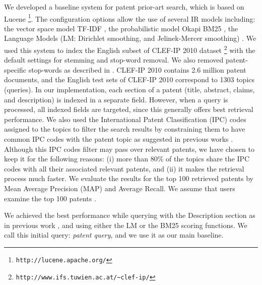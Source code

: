 We developed a baseline system for patent prior-art search, which
is based on Lucene%
\footnote{\texttt{http://lucene.apache.org/}%
}. The configuration options allow the use of several IR models including:
the vector space model TF-IDF \cite{Salton1975}, the probabilistic
model Okapi BM25 \cite{Robertson1993}, the Language Models (LM: Dirichlet
smoothing, and Jelinek-Mercer smoothing) \cite{Zhai2001}. We used
this system to index the English subset of CLEF-IP 2010 dataset%
\footnote{\texttt{http://www.ifs.tuwien.ac.at/\textasciitilde{}clef-ip/}%
} with the default settings for stemming and stop-word removal. We
also removed patent-specific stop-words as described in \cite{magdy2012toward}.
CLEF-IP 2010 contains 2.6 million patent documents, and the English
test sets of CLEF-IP 2010 correspond to 1303 topics (queries). In
our implementation, each section of a patent (title, abstract, claims,
and description) is indexed in a separate field. However, when a query
is processed, all indexed fields are targeted, since this generally
offers best retrieval performance. We also used the International
Patent Classification (IPC) codes assigned to the topics to filter
the search results by constraining them to have common IPC codes with
the patent topic as suggested in previous works \cite{lopez2010patatras}.
Although this IPC codes filter may pass over  relevant patents, we
have chosen to keep it for the following reasons: (i) more than 80\%
of the topics share the IPC codes with all their associated relevant
patents, and (ii) it makes the retrieval process much faster. We evaluate
the results for the top 100 retrieved patents by Mean Average Precision
(MAP) and Average Recall. We assume that users examine the top 100
patents \cite{joho2010survey}.

We achieved the best performance while querying with the Description
section as in previous work \cite{xue2009transforming}, and using
either the LM or the BM25 scoring functions. We call this initial
query: \emph{patent query}, and we use it as our main baseline.